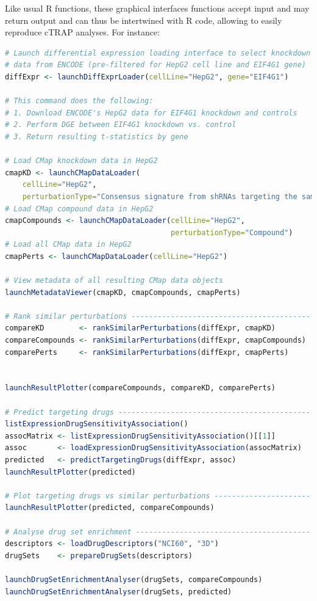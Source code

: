 Like usual R functions, these graphical interfaces functions accept input and may return output and can thus be intertwined with R code, allowing to easily reproduce cTRAP analyses. For instance:

\begin{lstlisting}[language=R,morekeywords={include, launchDiffExprLoader},keywordstyle=\bfseries]
# Launch differential expression loading interface to select knockdown
# data from ENCODE (pre-filtered for HepG2 cell line and EIF4G1 gene)
diffExpr <- launchDiffExprLoader(cellLine="HepG2", gene="EIF4G1")

# This command does the following:
# 1. Download ENCODE's HepG2 data for EIF4G1 knockdown and controls
# 2. Perform DGE between EIF4G1 knockdown vs. control
# 3. Return resulting t-statistics by gene

# Load CMap knockdown data in HepG2
cmapKD <- launchCMapDataLoader(
    cellLine="HepG2",
    perturbationType="Consensus signature from shRNAs targeting the same gene")
# Load CMap compound data in HepG2
cmapCompounds <- launchCMapDataLoader(cellLine="HepG2",
                                      perturbationType="Compound")
# Load all CMap data in HepG2
cmapPerts <- launchCMapDataLoader(cellLine="HepG2")

# View metadata of all resulting CMap data objects
launchMetadataViewer(cmapKD, cmapCompounds, cmapPerts)

# Rank similar perturbations -----------------------------------------
compareKD        <- rankSimilarPerturbations(diffExpr, cmapKD)
compareCompounds <- rankSimilarPerturbations(diffExpr, cmapCompounds)
comparePerts     <- rankSimilarPerturbations(diffExpr, cmapPerts)


launchResultPlotter(compareCompounds, compareKD, comparePerts)

# Predict targeting drugs --------------------------------------------
listExpressionDrugSensitivityAssociation()
assocMatrix <- listExpressionDrugSensitivityAssociation()[[1]]
assoc       <- loadExpressionDrugSensitivityAssociation(assocMatrix)
predicted   <- predictTargetingDrugs(diffExpr, assoc)
launchResultPlotter(predicted)

# Plot targeting drugs vs similar perturbations ----------------------
launchResultPlotter(predicted, compareCompounds)

# Analyse drug set enrichment ----------------------------------------
descriptors <- loadDrugDescriptors("NCI60", "3D")
drugSets    <- prepareDrugSets(descriptors)

launchDrugSetEnrichmentAnalyser(drugSets, compareCompounds)
launchDrugSetEnrichmentAnalyser(drugSets, predicted)
\end{lstlisting}

